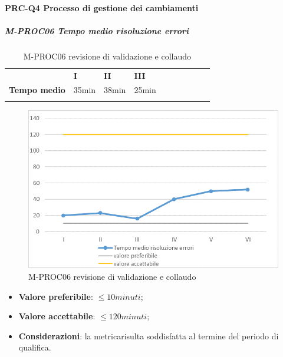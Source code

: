 \paragraph*{PRC-Q4 Processo di gestione dei cambiamenti}
\subparagraph{M-PROC06 Tempo medio risoluzione errori} \mbox{}
\begin{longtable}[H!] {						
		>{}p{35mm}  		
		>{}p{12mm}
		>{}p{12mm}		
		>{}p{12mm}		
		>{}p{12mm}		
		>{}p{12mm}		
		>{}p{12mm}
		>{}p{12mm}
		>{}p{12mm}
		>{}p{12mm}
	}
	\rowcolor{gray!50}
	\textbf{} & \textbf{I} & \textbf{II} & \textbf{III} \TBstrut \\ [2mm]
	\textbf{Tempo medio} & 35min & 38min & 25min  \TBstrut \\ [2mm]
	\rowcolor{white}
	\caption{M-PROC06 revisione di validazione e collaudo}
\end{longtable}
\begin{figure}[H] 	
	\includegraphics[width=\linewidth]{./img/grafici/RQ6.png}	
	\caption{M-PROC06 revisione di validazione e collaudo}	
\end{figure}
\begin{itemize}
	\item \textbf{Valore preferibile}: $\le10minuti$;
	\item \textbf{Valore accettabile}: $\le120minuti$;
	\item \textbf{Considerazioni}: la metrica\glosp risulta soddisfatta al termine del periodo di qualifica.
\end{itemize}

